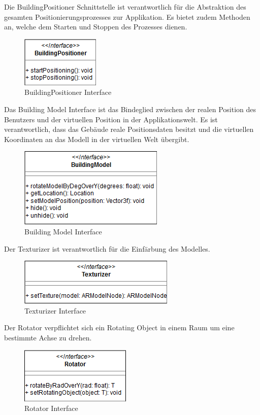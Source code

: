 \documentclass[a4paper]{scrreprt}
\begin{document}
Die BuildingPositioner Schnittstelle ist verantwortlich für die Abstraktion des gesamten Positionierungsprozesses zur Applikation. Es bietet zudem Methoden an, welche dem Starten und Stoppen des Prozesses dienen.
\begin{figure}[h!]
	\center
	\includegraphics[scale=0.6]{BuildingPositioner.png}
	\caption{BuildingPositioner Interface}
\end{figure}
\clearpage
Das Building Model Interface ist das Bindeglied zwischen der realen Position des Benutzers und der virtuellen Position in der Applikationswelt. Es ist verantwortlich, dass das Gebäude reale Positionsdaten besitzt und die virtuellen Koordinaten an das Modell in der virtuellen Welt übergibt.

\begin{figure}[h!]
	\center
	\includegraphics[scale=0.6]{BuildingModel.png}
	\caption{Building Model Interface}
\end{figure}

Der Texturizer ist verantwortlich für die Einfärbung des Modelles.
\begin{figure}[h!]
	\center
	\includegraphics[scale=0.6]{Texturizer.png}
	\caption{Texturizer Interface}
\end{figure}


Der Rotator verpflichtet sich ein Rotating Object in einem Raum um eine bestimmte Achse zu drehen.
\begin{figure}[h!]
	\center
	\includegraphics[scale=0.6]{Rotator.png}
	\caption{Rotator Interface}
\end{figure}
\end{document}
